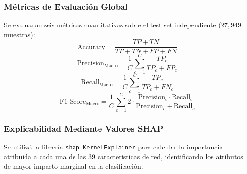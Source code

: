 \subsubsection{Métricas de Evaluación Global}
Se evaluaron seis métricas cuantitativas sobre el test set independiente ($27,949$ muestras):
\begin{equation}
\text{Accuracy} = \frac{TP + TN}{TP + TN + FP + FN}
\end{equation}
\begin{equation}
\text{Precision}_{\text{Macro}} = \frac{1}{C} \sum_{c=1}^C \frac{TP_c}{TP_c + FP_c}
\end{equation}
\begin{equation}
\text{Recall}_{\text{Macro}} = \frac{1}{C} \sum_{c=1}^C \frac{TP_c}{TP_c + FN_c}
\end{equation}
\begin{equation}
\text{F1-Score}_{\text{Macro}} = \frac{1}{C} \sum_{c=1}^C 2 \cdot \frac{\text{Precision}_c \cdot \text{Recall}_c}{\text{Precision}_c + \text{Recall}_c}
\end{equation}

\subsubsection{Explicabilidad Mediante Valores SHAP}
Se utilizó la librería \texttt{shap.KernelExplainer} para calcular la importancia atribuida a cada una de las 39 características de red, identificando los atributos de mayor impacto marginal en la clasificación.
